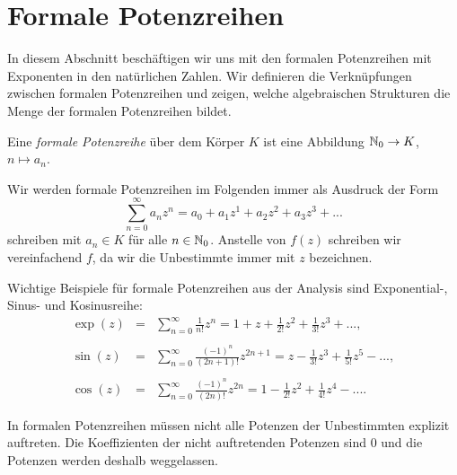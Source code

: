\section{Formale Potenzreihen}\label{potenzreihenring}

%
In diesem Abschnitt beschäftigen wir uns mit den formalen Potenzreihen mit Exponenten in den natürlichen Zahlen. Wir definieren die Verknüpfungen zwischen formalen Potenzreihen und zeigen, welche algebraischen Strukturen die Menge der formalen Potenzreihen bildet.
  
\begin{defn}
Eine \textit{formale Potenzreihe} über dem Körper $K$ ist eine Abbildung $\mathbb{N}_0 \rightarrow K$, $n \mapsto a_n$.
\end{defn}
\newpage
\begin{bemnota}
Wir werden formale Potenzreihen im Folgenden immer als Ausdruck der Form
\begin{equation}\label{eq: formalepotenzreihe}
\sum_{n=0}^\infty a_n z^n = a_0 + a_1z^1 + a_2z^2 + a_3z^3 + ...
\end{equation}
schreiben mit $a_n \in K$ für alle $n \in \mathbb{N}_0$.
Anstelle von $f(z)$ schreiben wir vereinfachend $f$, da wir die Unbestimmte immer mit $z$ bezeichnen.
\end{bemnota}
%
%
%
% 
%
%
%
\begin{bsp}
Wichtige Beispiele für formale Potenzreihen aus der Analysis sind Exponential-, Sinus- und Kosinusreihe:
\begin{eqnarray*}
\exp(z) &=& \sum_{n=0}^{\infty} \frac{1}{n!} z^n
= 1 + z +\frac{1}{2!} z^2 + \frac{1}{3!} z^3 + ..., \\ \\
\sin(z) &=& \sum_{n= 0}^{\infty} \frac{\left(-1\right)^n}{\left(2n + 1\right)!} z^{2n+1} = z - \frac{1}{3!} z^3 + \frac{1}{5!} z^5 - ...,\\\\
\cos(z) &=& \sum_{n= 0}^{\infty} \frac{\left(-1\right)^n}{\left(2n\right)!} z^{2n}
= 1 - \frac{1}{2!} z^2 + \frac{1}{4!} z^4 - ....
\end{eqnarray*}
\end{bsp}
%
\begin{bem}
In formalen Potenzreihen müssen nicht alle Potenzen der Unbestimmten explizit auftreten. Die Koeffizienten der nicht auftretenden Potenzen sind $0$ und die Potenzen werden deshalb weggelassen.
\end{bem}
%

